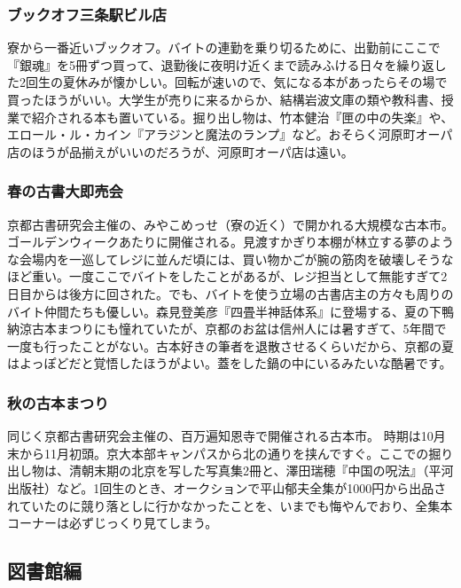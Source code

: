 \subsubsection{ブックオフ三条駅ビル店}
寮から一番近いブックオフ。バイトの連勤を乗り切るために、出勤前にここで『銀魂』を5冊ずつ買って、退勤後に夜明け近くまで読みふける日々を繰り返した2回生の夏休みが懐かしい。回転が速いので、気になる本があったらその場で買ったほうがいい。大学生が売りに来るからか、結構岩波文庫の類や教科書、授業で紹介される本も置いている。掘り出し物は、竹本健治『匣の中の失楽』や、エロール・ル・カイン『アラジンと魔法のランプ』など。おそらく河原町オーパ店のほうが品揃えがいいのだろうが、河原町オーパ店は遠い。

\subsubsection{春の古書大即売会}
京都古書研究会主催の、みやこめっせ（寮の近く）で開かれる大規模な古本市。ゴールデンウィークあたりに開催される。見渡すかぎり本棚が林立する夢のような会場内を一巡してレジに並んだ頃には、買い物かごが腕の筋肉を破壊しそうなほど重い。一度ここでバイトをしたことがあるが、レジ担当として無能すぎて2日目からは後方に回された。でも、バイトを使う立場の古書店主の方々も周りのバイト仲間たちも優しい。森見登美彦『四畳半神話体系』に登場する、夏の下鴨納涼古本まつりにも憧れていたが、京都のお盆は信州人には暑すぎて、5年間で一度も行ったことがない。古本好きの筆者を退散させるくらいだから、京都の夏はよっぽどだと覚悟したほうがよい。蓋をした鍋の中にいるみたいな酷暑です。

\subsubsection{秋の古本まつり}
同じく京都古書研究会主催の、百万遍知恩寺で開催される古本市。
時期は10月末から11月初頭。京大本部キャンパスから北の通りを挟んですぐ。ここでの掘り出し物は、清朝末期の北京を写した写真集2冊と、澤田瑞穂『中国の呪法』（平河出版社）など。1回生のとき、オークションで平山郁夫全集が1000円から出品されていたのに競り落としに行かなかったことを、いまでも悔やんでおり、全集本コーナーは必ずじっくり見てしまう。

\subsection{図書館編}


